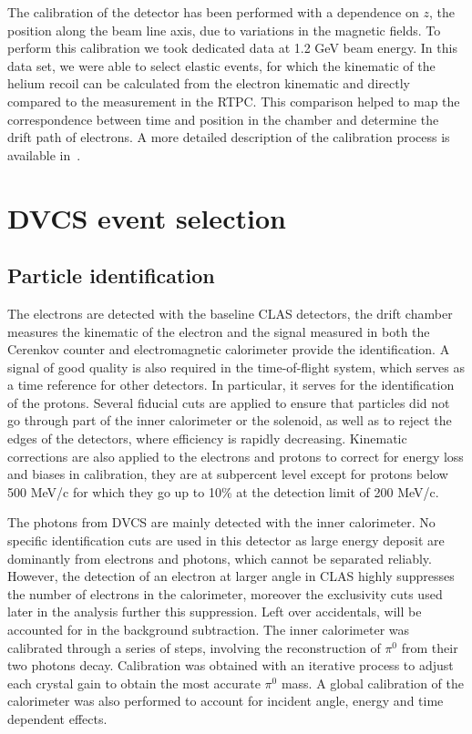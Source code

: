 \documentclass[aps,prc,preprint,superscriptaddress]{revtex4}
\begin{document}
The calibration of the detector has been performed with a 
dependence on $z$, the position along the beam line axis, due to 
variations in the magnetic fields. To perform this calibration we took  
dedicated data at 1.2 GeV beam energy. In 
this data set, we were able to select elastic events, for which the kinematic 
of the helium recoil can be calculated from the electron kinematic and 
directly compared to the measurement in the RTPC. This comparison helped to 
map the correspondence between time and position in the chamber and determine 
the drift path of electrons. A more detailed description of the calibration process 
is available in~\cite{Dupre:2017upj}.

\section{DVCS event selection}

\subsection{Particle identification}

The electrons are detected with the baseline CLAS detectors, the drift chamber measures the kinematic 
of the electron and the signal measured in both the Cerenkov counter and electromagnetic calorimeter
provide the identification. A signal of good quality is also required in the 
time-of-flight system, which serves as a time reference for other detectors. In particular, it 
serves for the identification of the protons. Several 
fiducial cuts are applied to ensure that particles did not go through part of the inner calorimeter 
or the solenoid, as well as to reject the edges of the detectors, where efficiency is rapidly 
decreasing. Kinematic corrections are also applied to the electrons and protons to correct for energy loss
and biases in calibration, they are at subpercent level except for protons below 500 MeV/c for which they
go up to 10\% at the detection limit of 200 MeV/c.

The photons from DVCS are mainly detected with the inner calorimeter. No specific 
identification cuts are used in this detector as large energy deposit are dominantly 
from electrons and photons, which cannot be separated reliably. However, the detection 
of an electron at larger angle in CLAS 
highly suppresses the number of electrons in the calorimeter, moreover
the exclusivity cuts used later in the analysis further this suppression. Left over accidentals, will be
accounted for in the background subtraction. The inner calorimeter was calibrated through a series
of steps, involving the reconstruction of $\pi^0$ from their two photons decay. Calibration was obtained 
with an iterative process to adjust each crystal gain to obtain the most accurate $\pi^0$ mass. A
global calibration of the calorimeter was also performed to account for incident angle, energy and 
time dependent effects.
\end{document}
